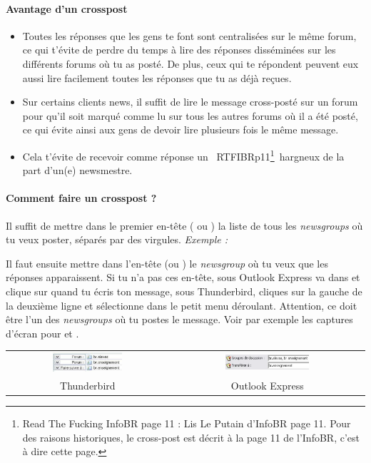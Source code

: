 \paragraph{Avantage d'un crosspost}
\begin{itemize}
 \item Toutes les réponses que les gens te font sont centralisées sur le même forum,
       ce qui t'évite de perdre du temps à lire des réponses disséminées
       sur les différents forums où tu as posté.
       De plus, ceux qui te répondent peuvent eux aussi lire facilement toutes les réponses
       que tu as déjà reçues.
 \item Sur certains clients news, il suffit de lire le message cross-posté sur un forum
       pour qu'il soit marqué comme lu sur tous les autres forums où il a été posté,
       ce qui évite ainsi aux gens de devoir lire plusieurs fois le même message.
 \item Cela t'évite de recevoir comme réponse un \guillemotleft~RTFIBRp11\footnote{Read The Fucking InfoBR page 11 :
       Lis Le Putain d'InfoBR page 11. Pour des raisons historiques, le cross-post est décrit à la page 11
       de l'InfoBR, c'est à dire cette page.}~\guillemotright  hargneux de la part d'un(e) newsmestre.
\end{itemize}

\paragraph{Comment faire un crosspost ?}
Il suffit de mettre dans le premier en-tête ( ou ) la liste de tous les \emph{newsgroups} où tu veux
poster, séparés par des virgules. \emph{Exemple :} 

Il faut ensuite mettre dans l'en-tête  (ou ) le \emph{newsgroup} où tu veux que les réponses apparaissent. Si
tu n'a pas ces en-tête, sous Outlook Express va dans  et clique sur  quand tu écris ton message, sous
Thunderbird, cliques sur la gauche de la deuxième ligne et sélectionne  dans le petit menu déroulant. Attention, ce doit être
l'un des \emph{newsgroups} où tu postes le message.
Voir par exemple les captures d'écran pour  et .\\

\noindent\begin{tabular}{cc}
\includegraphics[width=0.45\textwidth]{images/cross_post_TB}
     & \includegraphics[width=0.45\textwidth]{images/cross_post_OE} \\
Thunderbird & Outlook Express
\end{tabular}
\vskip 12pt

